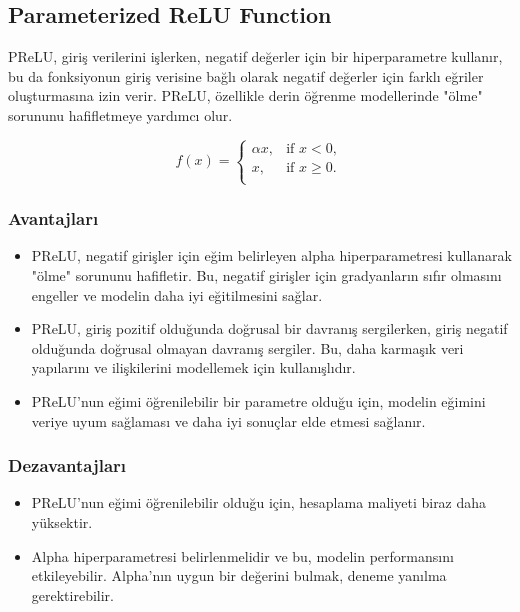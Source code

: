 \newpage

\subsection{Parameterized ReLU Function}
PReLU, giriş verilerini işlerken, negatif değerler için bir hiperparametre kullanır, bu da fonksiyonun giriş verisine bağlı olarak negatif değerler için farklı eğriler oluşturmasına izin verir. PReLU, özellikle derin öğrenme modellerinde "ölme" sorununu hafifletmeye yardımcı olur.

\[f(x) = \begin{cases} 
\alpha x, & \text{if } x < 0, \\
x, & \text{if } x \geq 0. \\
\end{cases}
\]

\subsubsection{Avantajları}
\begin{itemize}
    \item PReLU, negatif girişler için eğim belirleyen alpha hiperparametresi kullanarak "ölme" sorununu hafifletir. Bu, negatif girişler için gradyanların sıfır olmasını engeller ve modelin daha iyi eğitilmesini sağlar.
    \item PReLU, giriş pozitif olduğunda doğrusal bir davranış sergilerken, giriş negatif olduğunda doğrusal olmayan davranış sergiler. Bu, daha karmaşık veri yapılarını ve ilişkilerini modellemek için kullanışlıdır.
    \item PReLU'nun eğimi öğrenilebilir bir parametre olduğu için, modelin eğimini veriye uyum sağlaması ve daha iyi sonuçlar elde etmesi sağlanır.
\end{itemize}

\subsubsection{Dezavantajları}
\begin{itemize}
    \item PReLU'nun eğimi öğrenilebilir olduğu için, hesaplama maliyeti biraz daha yüksektir.
    \item Alpha hiperparametresi belirlenmelidir ve bu, modelin performansını etkileyebilir. Alpha'nın uygun bir değerini bulmak, deneme yanılma gerektirebilir.
\end{itemize}

\newpage

